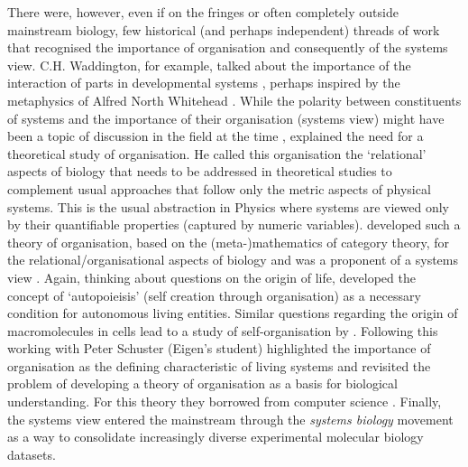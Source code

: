 There were, however, even if on the fringes or often completely outside
mainstream biology, few historical (and perhaps independent) threads of work
that recognised the importance of organisation and consequently of the systems
view. C.H. Waddington, for example, talked about the importance of the
interaction of parts in developmental systems \citep{allen_evolution_1977},
perhaps inspired by the metaphysics of Alfred North Whitehead \citep[same
book;][Autobiographical note]{allen_evolution_1977}. While the polarity between
constituents of systems and the importance of their organisation (systems view)
might have been a topic of discussion in the field at the time
\citep{waddington_nature_1961}, \citet{rashevsky_topology_1954} explained the
need for a theoretical study of organisation. He called this organisation the
`relational' aspects of biology that needs to be addressed in theoretical
studies to complement usual approaches that follow only the metric aspects of
physical systems. This is the usual abstraction in Physics where systems are
viewed only by their quantifiable properties (captured by numeric
variables). \citet{rosen_relational_1958} developed such a theory of
organisation, based on the (meta-)mathematics of category theory, for the
relational/organisational aspects of biology and was a proponent of a systems
view \citep{rosen1991life}. Again, thinking about questions on the origin of
life, \citet{varela_autopoiesis:_1974} developed the concept of `autopoieisis'
(self creation through organisation) as a necessary condition for autonomous
living entities. Similar questions regarding the origin of macromolecules in
cells lead to a study of self-organisation by
\citet{eigen_selforganization_1971}. Following this \citet{fontana_what_1994}
working with Peter Schuster (Eigen's student) highlighted the importance of
organisation as the defining characteristic of living systems and revisited the
problem of developing a theory of organisation as a basis for biological
understanding. For this theory they borrowed from computer science
\citep[$\lambda$-calculus in particular;][]{fontana_barrier_1996}. Finally, the
systems view entered the mainstream through the \emph{systems biology} movement
\citep{kitano2002systems} as a way to consolidate increasingly diverse
experimental molecular biology datasets.

